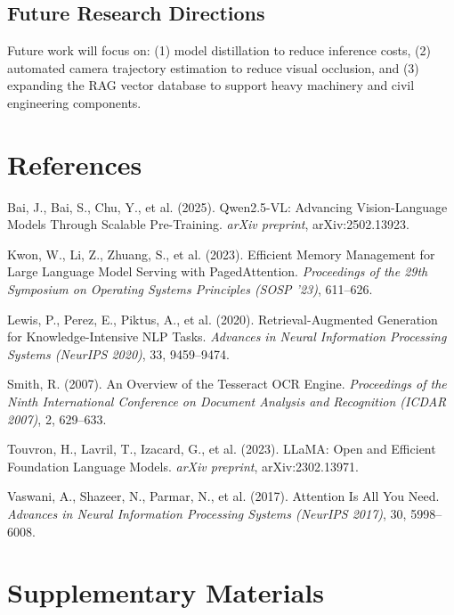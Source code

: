 \documentclass[11pt,letterpaper]{report}
\begin{document}
\section{Future Research Directions}
Future work will focus on: (1) model distillation to reduce inference costs, (2) automated camera trajectory estimation to reduce visual occlusion, and (3) expanding the RAG vector database to support heavy machinery and civil engineering components.

\chapter*{References}

\noindent
\hangindent=0.5in Bai, J., Bai, S., Chu, Y., et al. (2025). Qwen2.5-VL: Advancing Vision-Language Models Through Scalable Pre-Training. \textit{arXiv preprint}, arXiv:2502.13923.

\vspace{0.5em}
\noindent
\hangindent=0.5in Kwon, W., Li, Z., Zhuang, S., et al. (2023). Efficient Memory Management for Large Language Model Serving with PagedAttention. \textit{Proceedings of the 29th Symposium on Operating Systems Principles (SOSP '23)}, 611--626.

\vspace{0.5em}
\noindent
\hangindent=0.5in Lewis, P., Perez, E., Piktus, A., et al. (2020). Retrieval-Augmented Generation for Knowledge-Intensive NLP Tasks. \textit{Advances in Neural Information Processing Systems (NeurIPS 2020)}, 33, 9459--9474.

\vspace{0.5em}
\noindent
\hangindent=0.5in Smith, R. (2007). An Overview of the Tesseract OCR Engine. \textit{Proceedings of the Ninth International Conference on Document Analysis and Recognition (ICDAR 2007)}, 2, 629--633.

\vspace{0.5em}
\noindent
\hangindent=0.5in Touvron, H., Lavril, T., Izacard, G., et al. (2023). LLaMA: Open and Efficient Foundation Language Models. \textit{arXiv preprint}, arXiv:2302.13971.

\vspace{0.5em}
\noindent
\hangindent=0.5in Vaswani, A., Shazeer, N., Parmar, N., et al. (2017). Attention Is All You Need. \textit{Advances in Neural Information Processing Systems (NeurIPS 2017)}, 30, 5998--6008.

\appendix

\chapter{Supplementary Materials}
\end{document}
